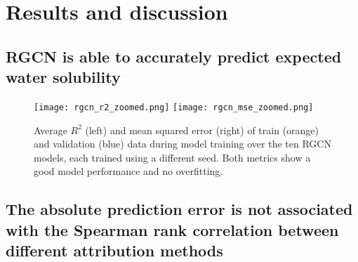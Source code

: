 \chapter{Results and discussion}

\section{RGCN is able to accurately predict expected water solubility}




\begin{figure}[h]
    \centering
    \texttt{[image: rgcn\_r2\_zoomed.png]}
    \texttt{[image: rgcn\_mse\_zoomed.png]}
    \caption{Average $R^2$ (left) and mean squared error (right) of train (orange) and validation 
    (blue) data during model training over the ten RGCN models, each trained using a different 
    seed. Both metrics show a good model performance and no overfitting. }
\end{figure}

\section{The absolute prediction error is not associated with the Spearman rank correlation between different attribution methods}



